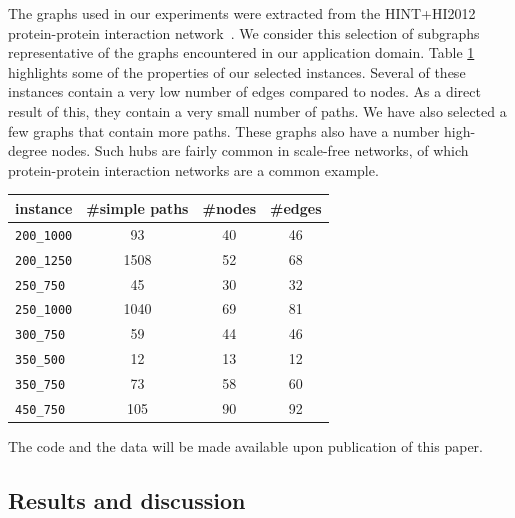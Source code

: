 \documentclass[conference]{IEEEtran}
\begin{document}
The graphs used in our experiments were extracted from the HINT+HI2012 protein-protein interaction network~\cite{das2012hint,yu2011next}. We consider this selection of subgraphs representative of the graphs encountered in our application domain. Table \ref{table:instanceInformation} highlights some of the properties of our selected instances. Several of these instances contain a very low number of edges compared to nodes. As a direct result of this, they contain a very small number of paths. We have also selected a few graphs that contain more paths. These graphs also have a number high-degree nodes. Such hubs are fairly common in scale-free networks, of which protein-protein interaction networks are a common example.


%


\begin{table}
\centering
\captionsetup{font=small}
\label{table:instanceInformation}
\begin{tabular}{|l c c c|}
\hline
\textbf{instance} & \textbf{\#simple paths} & \textbf{\#nodes} & \textbf{\#edges}\\
\hline
\texttt{200\_1000} & 93 & 40 & 46\\
\texttt{200\_1250} & 1508 & 52 & 68\\
\texttt{250\_750} & 45 & 30 & 32\\
\texttt{250\_1000} & 1040 & 69 & 81\\
\texttt{300\_750} & 59 & 44 & 46\\
\texttt{350\_500} & 12 & 13 & 12\\
\texttt{350\_750} & 73 & 58 & 60\\
\texttt{450\_750} & 105 & 90 & 92\\
\hline
\end{tabular}
\end{table}


The code and the data will be made available upon publication of this paper.

\subsection{Results and discussion}
\end{document}

